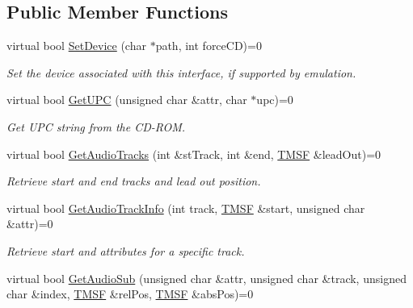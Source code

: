\subsection*{Public Member Functions}
\begin{DoxyCompactItemize}
\item 
\hypertarget{classCDROM__Interface_a60081f8d721b4456172f0a0b0d3b3b5a}{virtual bool \hyperlink{classCDROM__Interface_a60081f8d721b4456172f0a0b0d3b3b5a}{Set\-Device} (char $\ast$path, int force\-C\-D)=0}\label{classCDROM__Interface_a60081f8d721b4456172f0a0b0d3b3b5a}

\begin{DoxyCompactList}\small\item\em Set the device associated with this interface, if supported by emulation. \end{DoxyCompactList}\item 
\hypertarget{classCDROM__Interface_a7f2eaeb90673c95fd018ce1ff4f1fdaa}{virtual bool \hyperlink{classCDROM__Interface_a7f2eaeb90673c95fd018ce1ff4f1fdaa}{Get\-U\-P\-C} (unsigned char \&attr, char $\ast$upc)=0}\label{classCDROM__Interface_a7f2eaeb90673c95fd018ce1ff4f1fdaa}

\begin{DoxyCompactList}\small\item\em Get U\-P\-C string from the C\-D-\/\-R\-O\-M. \end{DoxyCompactList}\item 
\hypertarget{classCDROM__Interface_a3d9e5cf2a5812edc31badb6e4a79d51c}{virtual bool \hyperlink{classCDROM__Interface_a3d9e5cf2a5812edc31badb6e4a79d51c}{Get\-Audio\-Tracks} (int \&st\-Track, int \&end, \hyperlink{structSMSF}{T\-M\-S\-F} \&lead\-Out)=0}\label{classCDROM__Interface_a3d9e5cf2a5812edc31badb6e4a79d51c}

\begin{DoxyCompactList}\small\item\em Retrieve start and end tracks and lead out position. \end{DoxyCompactList}\item 
\hypertarget{classCDROM__Interface_adda0f3d505f7cd4bdf762508fc1962fb}{virtual bool \hyperlink{classCDROM__Interface_adda0f3d505f7cd4bdf762508fc1962fb}{Get\-Audio\-Track\-Info} (int track, \hyperlink{structSMSF}{T\-M\-S\-F} \&start, unsigned char \&attr)=0}\label{classCDROM__Interface_adda0f3d505f7cd4bdf762508fc1962fb}

\begin{DoxyCompactList}\small\item\em Retrieve start and attributes for a specific track. \end{DoxyCompactList}\item 
\hypertarget{classCDROM__Interface_a2028b67399e88e5ce1ea1d18a1db75fb}{virtual bool \hyperlink{classCDROM__Interface_a2028b67399e88e5ce1ea1d18a1db75fb}{Get\-Audio\-Sub} (unsigned char \&attr, unsigned char \&track, unsigned char \&index, \hyperlink{structSMSF}{T\-M\-S\-F} \&rel\-Pos, \hyperlink{structSMSF}{T\-M\-S\-F} \&abs\-Pos)=0}\label{classCDROM__Interface_a2028b67399e88e5ce1ea1d18a1db75fb}


\end{DoxyCompactItemize}
